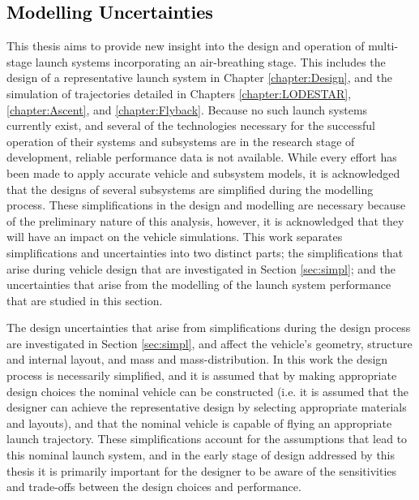 





\textcolor{black}{
\chapter{Modelling Uncertainties}\label{Appendix:unc}
}


\noindent
This thesis aims to provide new insight into the design and operation of multi-stage launch systems incorporating an air-breathing stage. This includes the design of a representative launch system in Chapter \ref{chapter:Design}, and the simulation of trajectories detailed in Chapters \ref{chapter:LODESTAR}, \ref{chapter:Ascent}, and \ref{chapter:Flyback}.
Because no such launch systems currently exist, and several of the technologies necessary for the successful operation of their systems and subsystems are in the research stage of development, reliable performance data is not available. While every effort has been made to apply accurate vehicle and subsystem models, it is acknowledged that the designs of several subsystems are simplified during the modelling process. These simplifications in the design and modelling are necessary because of the preliminary nature of this analysis, however, it is acknowledged that they will have an impact on the vehicle simulations. 
This work separates simplifications and uncertainties into two distinct parts; the simplifications that arise during vehicle design that are investigated in Section \ref{sec:simpl}; and the uncertainties that arise from the modelling of the launch system performance that are studied in this section. 

The design uncertainties that arise from simplifications during the design process are investigated in Section \ref{sec:simpl}, and affect the vehicle's geometry, structure and internal layout, and mass and mass-distribution. In this work the design process is necessarily simplified, and it is assumed that by making appropriate design choices the nominal vehicle can be constructed (i.e. it is assumed that the designer can achieve the representative design by selecting appropriate materials and layouts), and that the nominal vehicle is capable of flying an appropriate launch trajectory. These simplifications account for the assumptions that lead to this nominal launch system, and in the early stage of design addressed by this thesis it is primarily important for the designer to be aware of the sensitivities and trade-offs between the design choices and performance. 

